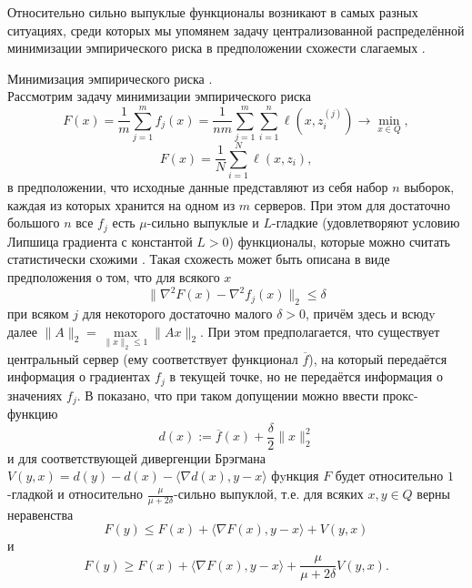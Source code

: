     Относительно сильно выпуклые функционалы возникают в самых разных ситуациях, среди которых мы упомянем задачу централизованной распределённой минимизации эмпирического риска в предположении схожести слагаемых \cite{Hendr}.

     \begin{example}{Минимизация эмпирического риска \cite{Hendr}.}\label{min_risk}\\
    	Рассмотрим задачу минимизации эмпирического риска
    	\begin{equation}\label{EmpirProbl}
    F(x)=\frac{1}{m} \sum_{j=1}^{m} f_{j}(x)=\frac{1}{n m} \sum_{j=1}^{m} \sum_{i=1}^{n} \ell\left(x, z_{i}^{(j)}\right)
    \rightarrow\min\limits_{x\in Q},
    	\end{equation}
    	\begin{equation}
    	F(x)=\frac{1}{N}\sum\limits_{i=1}^N \ell(x,z_i),
    	\end{equation}
    	в предположении, что исходные данные представляют из себя набор $n$ выборок, каждая из которых хранится на одном из $m$ серверов. При этом для достаточно большого $n$ все $f_j$ есть $\mu$-сильно выпуклые и $L$-гладкие (удовлетворяют условию Липшица градиента с константой $L > 0$) функционалы, которые можно считать статистически схожими \cite{Hendr}. Такая схожесть может быть описана в виде предположения \cite{Hendr} о том, что для всякого $x$
    	$$
    	\|\nabla^2 F(x) - \nabla^2 f_j (x)\|_2 \leq \delta
    	$$
    	при всяком $j$ для некоторого достаточно малого $\delta >0$, причём здесь и всюдy далее $\|A\|_2 = \max\limits_{\|x\|_2 \leq 1}\|Ax\|_2$. При этом предполагается, что существует центральный сервер (ему соответствует функционал $\overline{f}$), на который передаётся информация о градиентах $f_j$ в текущей точке, но не передаётся информация о значениях $f_j$. В \cite{Hendr} показано, что при таком допущении можно ввести прокс-функцию
    	\begin{equation}\label{prox_risk}
    	d(x):= \overline{f}(x) + \frac{\delta}{2}\|x\|_2^2 
    	\end{equation}
    	и для соответствующей дивергенции Брэгмана $V(y, x) = d(y) - d(x) - \langle \nabla d(x), y -x \rangle$ фyнкция $F$ будет относительно $1$-гладкой и относительно $\frac{\mu}{\mu + 2\delta}$-сильно выпуклой, т.е. для всяких $x, y \in Q$ верны неравенства
    $$
    F(y) \leq F(x) + \langle \nabla F(x), y - x\rangle + V(y, x)
    $$
    и
    $$
    F(y) \geq F(x) + \langle \nabla F(x), y - x\rangle + \frac{\mu}{\mu + 2\delta} V(y, x).
    $$
    	

\end{example}
